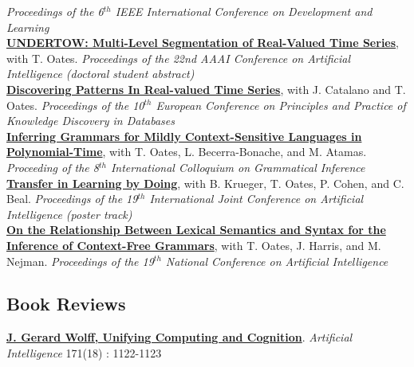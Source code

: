 \documentclass[12pt]{article}
\newcommand{\years}[1]{\marginpar{\scriptsize #1}}
\begin{document}
{\em Proceedings of the 6$^{th}$ IEEE International Conference on Development and 
Learning}\\[0.3cm]
\href{http://www.tarmstro.com/pubs/armstrong_aaai_07.pdf}{{\bf UNDERTOW: Multi-Level Segmentation of Real-Valued Time Series}}, with T. Oates.  {\em Proceedings of the 22nd AAAI Conference on Artificial Intelligence (doctoral student abstract)}\\[0.3cm]
\newpage
\years{2006}\href{http://dx.doi.org/10.1007/11871637_44}{{\bf Discovering Patterns In Real-valued Time Series}}, with J. Catalano and T. Oates.  {\em Proceedings of the 10$^{th}$ European Conference on Principles and Practice of Knowledge Discovery in Databases}\\[0.3cm]
\href{http://dx.doi.org/10.1007/11872436_12}{{\bf Inferring Grammars for Mildly Context-Sensitive Languages in Polynomial-Time}}, with T. Oates, L. Becerra-Bonache, and M. Atamas. {\em Proceeding of the 8$^{th}$ International Colloquium on Grammatical Inference}\\[0.3cm]
\years{2005}\href{http://www.ijcai.org/papers/post-0508.pdf}{{\bf Transfer in Learning by Doing}}, with B. Krueger, T. Oates, P. Cohen, and C. Beal.  {\em Proceedings of the 19$^{th}$ International Joint Conference on Artificial Intelligence (poster track)}\\[0.3cm]
\years{2004}\href{http://www.tarmstro.com/pubs/armstrong_aaai_04.pdf}{{\bf On the Relationship Between Lexical Semantics and Syntax for the Inference of Context-Free Grammars}}, with T. Oates, J. Harris, and M. Nejman. {\em Proceedings of the 19$^{th}$ National Conference on Artificial Intelligence}

\subsection*{Book Reviews}
\noindent
\years{2007}\href{http://dx.doi.org/10.1016/j.artint.2007.10.014}{{\bf J. Gerard Wolff, Unifying Computing and Cognition}}.  {\em Artificial Intelligence} 171(18) : 1122-1123
\end{document}
